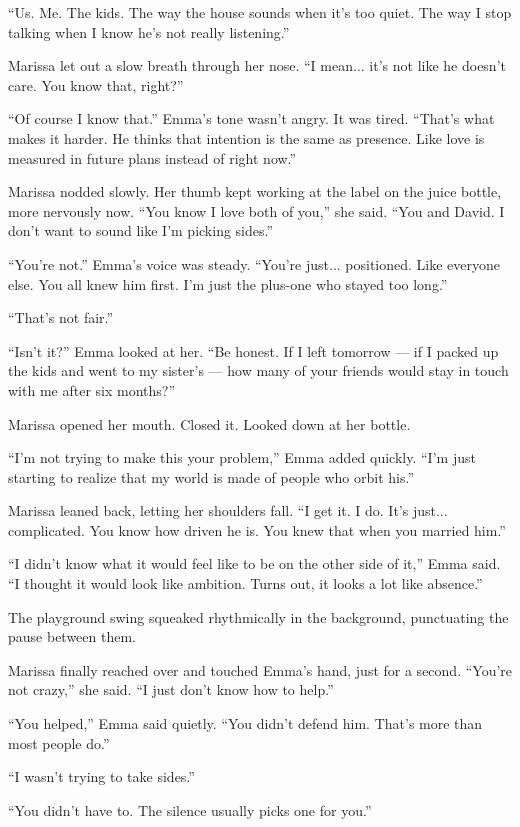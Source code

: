 ``Us. Me. The kids. The way the house sounds when it’s too quiet. The way I stop talking when I know 
he’s not really listening.''

Marissa let out a slow breath through her nose. ``I mean... it’s not like he doesn’t care. You know that, 
right?''

``Of course I know that.'' Emma’s tone wasn’t angry. It was tired. ``That’s what makes it harder. He 
thinks that intention is the same as presence. Like love is measured in future plans instead of right 
now.''

Marissa nodded slowly. Her thumb kept working at the label on the juice bottle, more nervously now. 
``You know I love both of you,'' she said. ``You and David. I don’t want to sound like I’m picking 
sides.''

``You’re not.'' Emma’s voice was steady. ``You’re just... positioned. Like everyone else. You all knew 
him first. I’m just the plus-one who stayed too long.''

``That’s not fair.''

``Isn’t it?'' Emma looked at her. ``Be honest. If I left tomorrow — if I packed up the kids and went to 
my sister’s — how many of your friends would stay in touch with me after six months?''

Marissa opened her mouth. Closed it. Looked down at her bottle.

``I’m not trying to make this your problem,'' Emma added quickly. ``I’m just starting to realize that my 
world is made of people who orbit his.''

Marissa leaned back, letting her shoulders fall. ``I get it. I do. It’s just... complicated. You know how 
driven he is. You knew that when you married him.''

``I didn’t know what it would feel like to be on the other side of it,'' Emma said. ``I thought it would 
look like ambition. Turns out, it looks a lot like absence.''

The playground swing squeaked rhythmically in the background, punctuating the pause between them.

Marissa finally reached over and touched Emma’s hand, just for a second. ``You’re not crazy,'' she said. 
``I just don’t know how to help.''

``You helped,'' Emma said quietly. ``You didn’t defend him. That’s more than most people do.''

``I wasn’t trying to take sides.''

``You didn’t have to. The silence usually picks one for you.''


